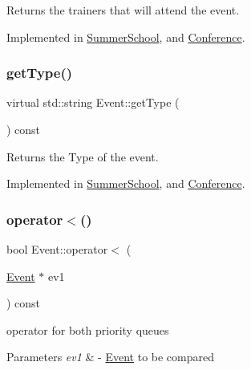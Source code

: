 Returns the trainers that will attend the event. 



Implemented in \mbox{\hyperlink{classSummerSchool_aba18410ee9fbafd26858232104b5b39f}{Summer\+School}}, and \mbox{\hyperlink{classConference_aae9e92d48205a80fa42e94564e3568c5}{Conference}}.

\mbox{\label{classEvent_a224dbd9a9aee5937ba0c8ea1a056af1f}} 
\subsubsection{\texorpdfstring{get\+Type()}{getType()}}
{\footnotesize\ttfamily virtual std\+::string Event\+::get\+Type (\begin{DoxyParamCaption}{ }\end{DoxyParamCaption}) const\hspace{0.3cm}{\ttfamily [pure virtual]}}



Returns the Type of the event. 



Implemented in \mbox{\hyperlink{classSummerSchool_a2ba547411ca8f161c2c579f9f55f913e}{Summer\+School}}, and \mbox{\hyperlink{classConference_ad1cf07b29a4c4cc36483603ef9536186}{Conference}}.

\mbox{\label{classEvent_a9a62a5f6528c63c84c30fa9edd50ddb1}} 
\subsubsection{\texorpdfstring{operator$<$()}{operator<()}}
{\footnotesize\ttfamily bool Event\+::operator$<$ (\begin{DoxyParamCaption}\item[{\mbox{\hyperlink{classEvent}{Event}} $\ast$}]{ev1 }\end{DoxyParamCaption}) const}



operator for both priority queues 


\begin{DoxyParams}{Parameters}
{\em ev1} & -\/ \mbox{\hyperlink{classEvent}{Event}} to be compared \\
\hline
\end{DoxyParams}
\mbox{\label{classEvent_a21f01e4574335753b415d3445f1ebdff}} 
